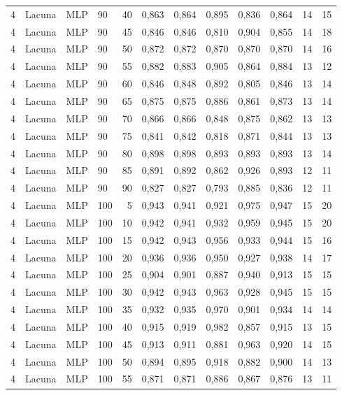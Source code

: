\begin{longtable}{ccclrrrrrrrr}
4 & Lacuna & MLP & 90 & 40 & 0,863 & 0,864 & 0,895 & 0,836 & 0,864 & 14 & 15 \\
4 & Lacuna & MLP & 90 & 45 & 0,846 & 0,846 & 0,810 & 0,904 & 0,855 & 14 & 18 \\
4 & Lacuna & MLP & 90 & 50 & 0,872 & 0,872 & 0,870 & 0,870 & 0,870 & 14 & 16 \\
4 & Lacuna & MLP & 90 & 55 & 0,882 & 0,883 & 0,905 & 0,864 & 0,884 & 13 & 12 \\
4 & Lacuna & MLP & 90 & 60 & 0,846 & 0,848 & 0,892 & 0,805 & 0,846 & 13 & 14 \\
4 & Lacuna & MLP & 90 & 65 & 0,875 & 0,875 & 0,886 & 0,861 & 0,873 & 13 & 14 \\
4 & Lacuna & MLP & 90 & 70 & 0,866 & 0,866 & 0,848 & 0,875 & 0,862 & 13 & 13 \\
4 & Lacuna & MLP & 90 & 75 & 0,841 & 0,842 & 0,818 & 0,871 & 0,844 & 13 & 13 \\
4 & Lacuna & MLP & 90 & 80 & 0,898 & 0,898 & 0,893 & 0,893 & 0,893 & 13 & 14 \\
4 & Lacuna & MLP & 90 & 85 & 0,891 & 0,892 & 0,862 & 0,926 & 0,893 & 12 & 11 \\
4 & Lacuna & MLP & 90 & 90 & 0,827 & 0,827 & 0,793 & 0,885 & 0,836 & 12 & 11 \\
4 & Lacuna & MLP & 100 & 5 & 0,943 & 0,941 & 0,921 & 0,975 & 0,947 & 15 & 20 \\
4 & Lacuna & MLP & 100 & 10 & 0,942 & 0,941 & 0,932 & 0,959 & 0,945 & 15 & 20 \\
4 & Lacuna & MLP & 100 & 15 & 0,942 & 0,943 & 0,956 & 0,933 & 0,944 & 15 & 16 \\
4 & Lacuna & MLP & 100 & 20 & 0,936 & 0,936 & 0,950 & 0,927 & 0,938 & 14 & 17 \\
4 & Lacuna & MLP & 100 & 25 & 0,904 & 0,901 & 0,887 & 0,940 & 0,913 & 15 & 15 \\
4 & Lacuna & MLP & 100 & 30 & 0,942 & 0,943 & 0,963 & 0,928 & 0,945 & 15 & 15 \\
4 & Lacuna & MLP & 100 & 35 & 0,932 & 0,935 & 0,970 & 0,901 & 0,934 & 14 & 14 \\
4 & Lacuna & MLP & 100 & 40 & 0,915 & 0,919 & 0,982 & 0,857 & 0,915 & 13 & 15 \\
4 & Lacuna & MLP & 100 & 45 & 0,913 & 0,911 & 0,881 & 0,963 & 0,920 & 14 & 15 \\
4 & Lacuna & MLP & 100 & 50 & 0,894 & 0,895 & 0,918 & 0,882 & 0,900 & 14 & 13 \\
4 & Lacuna & MLP & 100 & 55 & 0,871 & 0,871 & 0,886 & 0,867 & 0,876 & 13 & 11 \\

\end{longtable}
